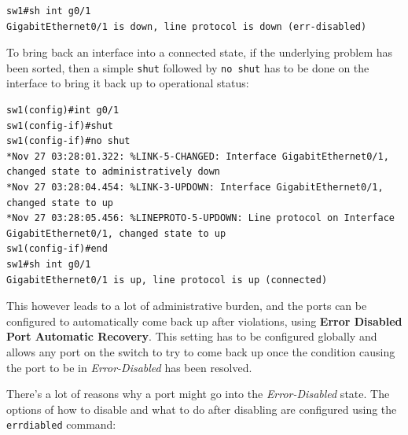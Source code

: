 \vspace{-15pt}
\begin{verbatim}
sw1#sh int g0/1
GigabitEthernet0/1 is down, line protocol is down (err-disabled)
\end{verbatim}
\vspace{-10pt}

\noindent
To bring back an interface into a connected state, if the underlying problem has been sorted, then a simple \verb|shut| followed by \verb|no shut| has to be done on the interface to bring it back up to operational status:

\vspace{-15pt}
\begin{verbatim}
sw1(config)#int g0/1
sw1(config-if)#shut
sw1(config-if)#no shut
*Nov 27 03:28:01.322: %LINK-5-CHANGED: Interface GigabitEthernet0/1, changed state to administratively down
*Nov 27 03:28:04.454: %LINK-3-UPDOWN: Interface GigabitEthernet0/1, changed state to up
*Nov 27 03:28:05.456: %LINEPROTO-5-UPDOWN: Line protocol on Interface GigabitEthernet0/1, changed state to up
sw1(config-if)#end
sw1#sh int g0/1
GigabitEthernet0/1 is up, line protocol is up (connected)
\end{verbatim}
\vspace{-10pt}

\noindent
This however leads to a lot of administrative burden, and the ports can be configured to automatically come back up after violations, using \textbf{Error Disabled Port Automatic Recovery}. This setting has to be configured globally and allows any port on the switch to try to come back up once the condition causing the port to be in \textit{Error-Disabled} has been resolved. 

There's a lot of reasons why a port might go into the \textit{Error-Disabled} state. The options of how to disable and what to do after disabling are configured using the \verb|errdiabled| command: 

